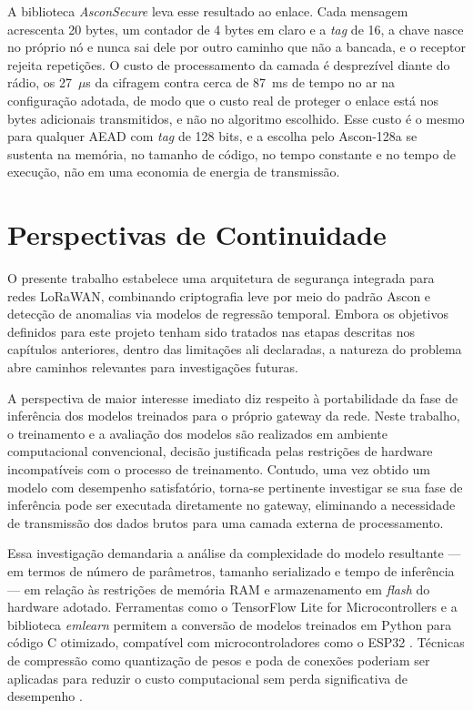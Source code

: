 A biblioteca \textit{AsconSecure} leva esse resultado ao enlace. Cada mensagem acrescenta 20 bytes, um contador de 4 bytes em claro e a \textit{tag} de 16, a chave nasce no próprio nó e nunca sai dele por outro caminho que não a bancada, e o receptor rejeita repetições. O custo de processamento da camada é desprezível diante do rádio, os 27~$\mu$s da cifragem contra cerca de 87~ms de tempo no ar na configuração adotada, de modo que o custo real de proteger o enlace está nos bytes adicionais transmitidos, e não no algoritmo escolhido. Esse custo é o mesmo para qualquer AEAD com \textit{tag} de 128 bits, e a escolha pelo Ascon-128a se sustenta na memória, no tamanho de código, no tempo constante e no tempo de execução, não em uma economia de energia de transmissão.

\section{Perspectivas de Continuidade}

O presente trabalho estabelece uma arquitetura de segurança integrada para 
redes LoRaWAN, combinando criptografia leve por meio do padrão Ascon e 
detecção de anomalias via modelos de regressão temporal. Embora os objetivos 
definidos para este projeto tenham sido tratados nas etapas descritas nos 
capítulos anteriores, dentro das limitações ali declaradas, a natureza do 
problema abre caminhos relevantes para investigações futuras.

A perspectiva de maior interesse imediato diz respeito à portabilidade da 
fase de inferência dos modelos treinados para o próprio gateway da rede. 
Neste trabalho, o treinamento e a avaliação dos modelos são realizados em 
ambiente computacional convencional, decisão justificada pelas restrições de 
hardware incompatíveis com o processo de treinamento. Contudo, uma vez 
obtido um modelo com desempenho satisfatório, torna-se pertinente investigar 
se sua fase de inferência pode ser executada diretamente no gateway, 
eliminando a necessidade de transmissão dos dados brutos para uma camada 
externa de processamento.

Essa investigação demandaria a análise da complexidade do modelo resultante 
— em termos de número de parâmetros, tamanho serializado e tempo de 
inferência — em relação às restrições de memória RAM e armazenamento em 
\textit{flash} do hardware adotado. Ferramentas como o TensorFlow Lite for 
Microcontrollers e a biblioteca \textit{emlearn} permitem a conversão de 
modelos treinados em Python para código C otimizado, compatível com 
microcontroladores como o ESP32 \cite{ray2022}. Técnicas de compressão como 
quantização de pesos e poda de conexões poderiam ser aplicadas para reduzir 
o custo computacional sem perda significativa de desempenho \cite{jacob2018}.

